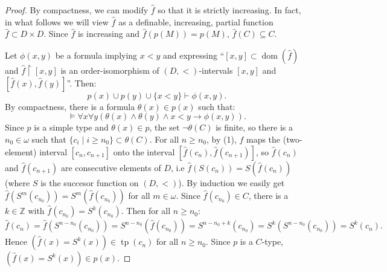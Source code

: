 \documentclass[12pt]{amsart}
\theoremstyle{definition}
\DeclareMathOperator{\tp}{tp}
\DeclareMathOperator{\dom}{dom}
\begin{document}
\begin{proof}
By compactness, we can modify $\hat f$ so that it is strictly increasing. In fact, in what follows we will view $\hat f$ as a definable, increasing, partial function  $\hat f\subset D\times D$. Since $\hat f$ is increasing and $\hat f(p(M))=p(M)$, $\hat f(C)\subseteq C$.


Let $\phi(x,y)$ be a formula implying $x<y$ and expressing  ``$[x,y]\subset \dom (\hat f)$ and $\hat f\restriction[x,y]$ is an order-isomorphism of $(D,<)$-intervals $[x,y]$ and $[\hat f(x),\hat f(y)]$''. Then:
$$ p(x)\cup p(y)\cup\{x<y\}\vdash \phi(x,y).$$
By compactness, there is a formula $\theta(x)\in p(x)$   such that:
\begin{equation}
\models  \forall x\forall y  (\theta(x)\land \theta(y)\land x<y\rightarrow \phi(x,y)).
\end{equation}
Since $p$ is a simple type and $\theta(x)\in p$, the set $\lnot\theta(C)$ is finite, so there is a $n_0\in \omega$ such that $\{c_i\mid i\geq n_0\}\subset \theta(C)$. For all $n\geq n_0$, by (1),  $f$ maps the (two-element) interval $[c_n,c_{n+1}]$ onto the interval $[\hat f(c_n),\hat f(c_{n+1})]$, so  
$\hat f(c_n)$ and $\hat f(c_{n+1})$ are consecutive elements of $D$, i.e $\hat f(S(c_n))=S(\hat f(c_n))$ (where $S$ is the succesor function on $(D,<)$). By induction we easily get  $\hat f(S^m(c_{n_0}))=S^m(\hat f(c_{n_0}))$ for all $m\in \omega$. Since $\hat f(c_{n_0})\in C$, there is a $k\in \mathbb Z$ with $\hat f(c_{n_0})=S^k(c_{n_0})$. Then for all $n\geq n_0$: 
$$\hat f(c_n)=\hat f(S^{n-n_0}(c_{n_0}))=    S^{n-n_0}(\hat f(c_{n_0}))=S^{n-n_0+k}(c_{n_0})=S^k(S^{n-n_0}(c_{n_0}))=S^k(c_n).$$ 
Hence  $(\hat f(x)=S^k(x))\in \tp(c_n)$ for  all $n\geq n_0$.  Since $p$ is a $C$-type, $(\hat f(x)=S^k(x))\in p(x)$.
\end{proof}
 
\end{document}
